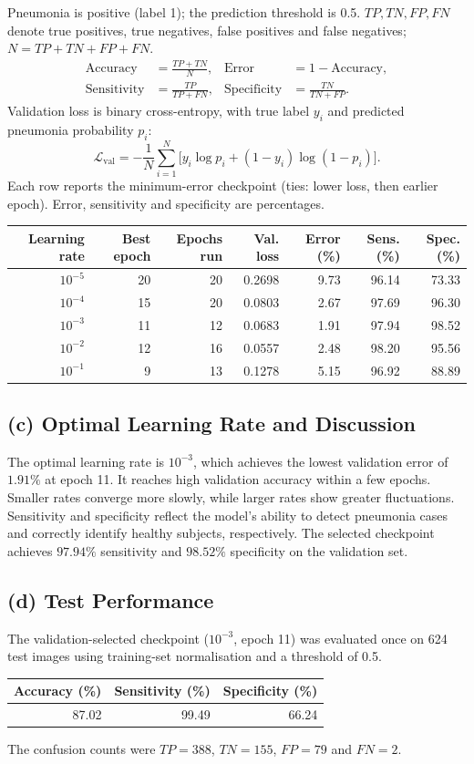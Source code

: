 \documentclass[10pt,a4paper]{article}
\begin{document}
Pneumonia is positive (label 1); the prediction threshold is 0.5. $TP,TN,FP,FN$ denote true positives, true negatives, false positives and false negatives; $N=TP+TN+FP+FN$.
\[
\begin{aligned}
\mathrm{Accuracy} &= \frac{TP+TN}{N}, &
\mathrm{Error} &= 1-\mathrm{Accuracy},\\
\mathrm{Sensitivity} &= \frac{TP}{TP+FN}, &
\mathrm{Specificity} &= \frac{TN}{TN+FP}.
\end{aligned}
\]
Validation loss is binary cross-entropy, with true label $y_i$ and predicted pneumonia probability $p_i$:
\[
\mathcal{L}_{\mathrm{val}}=-\frac{1}{N}\sum_{i=1}^{N}
\bigl[y_i\log p_i+(1-y_i)\log(1-p_i)\bigr].
\]
Each row reports the minimum-error checkpoint (ties: lower loss, then earlier epoch). Error, sensitivity and specificity are percentages.

\begin{center}\small
\begin{tabular}{rrrrrrr}\toprule
Learning rate & Best epoch & Epochs run & Val. loss & Error (\%) & Sens. (\%) & Spec. (\%)\\\midrule
$10^{-5}$ & 20 & 20 & 0.2698 & 9.73 & 96.14 & 73.33 \\
$10^{-4}$ & 15 & 20 & 0.0803 & 2.67 & 97.69 & 96.30 \\
$10^{-3}$ & 11 & 12 & 0.0683 & 1.91 & 97.94 & 98.52 \\
$10^{-2}$ & 12 & 16 & 0.0557 & 2.48 & 98.20 & 95.56 \\
$10^{-1}$ & 9 & 13 & 0.1278 & 5.15 & 96.92 & 88.89 \\
\bottomrule\end{tabular}
\end{center}
\subsection*{(c) Optimal Learning Rate and Discussion}
The optimal learning rate is $10^{-3}$, which achieves the lowest validation error of $1.91\%$ at epoch 11.
It reaches high validation accuracy within a few epochs. Smaller rates converge more slowly, while larger rates show greater fluctuations.
Sensitivity and specificity reflect the model's ability to detect pneumonia cases and correctly identify healthy subjects, respectively. The selected checkpoint achieves $97.94\%$ sensitivity and $98.52\%$ specificity on the validation set.
\subsection*{(d) Test Performance}
The validation-selected checkpoint ($10^{-3}$, epoch 11) was evaluated once on 624 test images using training-set normalisation and a threshold of 0.5.
\begin{center}\small
\begin{tabular}{rrr}\toprule
Accuracy (\%) & Sensitivity (\%) & Specificity (\%)\\\midrule
87.02 & 99.49 & 66.24 \\
\bottomrule\end{tabular}
\end{center}
The confusion counts were $TP=388$, $TN=155$, $FP=79$ and $FN=2$.
\end{document}
